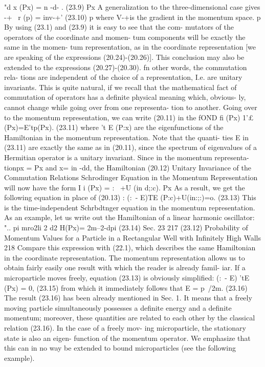 \documentclass[a4paper,sfsidenotes,colorlinks=true]{tufte-book}
\numberwithin{equation}{section}
\numberwithin{figure}{section}
\begin{document}
{{{{"d x (Px) = n -d- .	(23.9)
Px
A generalization to the three-dimensional case gives
-+~
r (p) = inv-+'	(23.10) p
where V-+is the gradient in the momentum space.
p
By using (23.1) and (23.9) it is easy to see that the com- mutators of the operators of the coordinate and momen- tum components will be exactly the same in the momen- tum representation, as in the coordinate representation [we are speaking of the expressions (20.24)-(20.26)]. This conclusion may also be extended to the expressions (20.27)-(20.30). fn other words, the commutation rela- tions are independent of the choice of a representation, I.e. are unitary invariants. This is quite natural, if we
recall that the mathematical fact of commutation of operators has a definite physical meaning which, obvious- ly, cannot change while going over from one representa- tion to another.
Going over to the momentum representation, we can write (20.11) in the fOND
fi (Px) 1'£	(Px)=E'tp(Px).	(23.11) where 't E (P:x) are the eigenfunctions of the Hamiltonian
in the momentum representation. Note that the quanti- ties E in (23.11) are exactly the same as in (20.11), since the spectrum of eigenvalues of a Hermitian operator is a unitary invariant. Since in the momentum representa-
tionpx = Px and x= in -dd, the Hamiltonian (20.12)
Unitary Invariance of the Commutation Relations
Schrodinger Equation in the Momentum Representation
will now have the form I i (Px) = :~ +U (in d;:c).
Px
As a result, we get the following equation in place of (20.13) :
(:~- E)TE (P:c)+U(in:;:)=o.	(23.13)
This is the time-independent Schrbdtnger equation in the momentum representation. As an example, let us write out the Hamiltonian of a linear harmonic oscillator:
"..	pi	mro2li 2	d2 H(Px)= 2m--2-dpi	(23.14)
Sec. 23
217
(23.12)
Probability of Momentum Values for a Particle in a Rectangular Well with Infinitely High Walls
218
Compare this expression with (22.1), which describes the same Hamiltonian in the coordinate representation. The momentum representation allows us to obtain fairly easily one result with which the reader is already famil- iar. If a microparticle moves freely, equation (23.13) is obviously simplified:
(:~- E) 'tE (Px) = 0,	(23.15)
from which it immediately follows that
E =	p~/2m.	(23.16)
The result (23.16) has been already mentioned in Sec. 1. It means that a freely moving particle simultaneously possesses a definite energy and a definite momentum; moreover, these quantities are related to each other by the classical relation (23.16). In the case of a freely mov- ing microparticle, the stationary state is also an eigen- function of the momentum operator. We emphasize that this can in no way be extended to bound microparticles (see the following example).
}}}}
\end{document}
